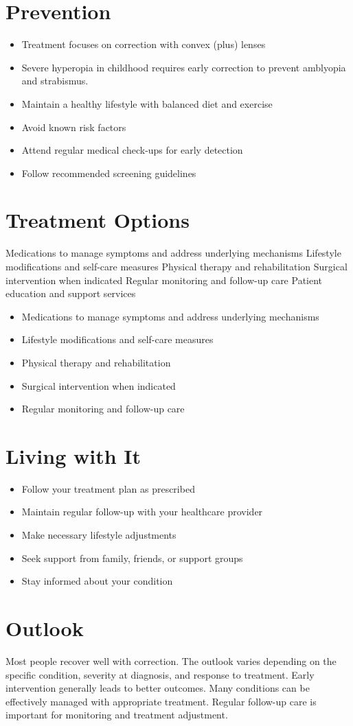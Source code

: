 \section{Prevention}
\begin{itemize}[noitemsep]
  \item Treatment focuses on correction with convex (plus) lenses
  \item Severe hyperopia in childhood requires early correction to prevent amblyopia and strabismus.
  \item Maintain a healthy lifestyle with balanced diet and exercise
  \item Avoid known risk factors
  \item Attend regular medical check-ups for early detection
  \item Follow recommended screening guidelines
\end{itemize}
\section{Treatment Options}
Medications to manage symptoms and address underlying mechanisms Lifestyle modifications and self-care measures Physical therapy and rehabilitation Surgical intervention when indicated Regular monitoring and follow-up care Patient education and support services

\begin{itemize}[noitemsep]
  \item Medications to manage symptoms and address underlying mechanisms
  \item Lifestyle modifications and self-care measures
  \item Physical therapy and rehabilitation
  \item Surgical intervention when indicated
  \item Regular monitoring and follow-up care
\end{itemize}
\section{Living with It}
\begin{itemize}[noitemsep]
  \item Follow your treatment plan as prescribed
  \item Maintain regular follow-up with your healthcare provider
  \item Make necessary lifestyle adjustments
  \item Seek support from family, friends, or support groups
  \item Stay informed about your condition
\end{itemize}
\section{Outlook}
Most people recover well with correction. The outlook varies depending on the specific condition, severity at diagnosis, and response to treatment. Early intervention generally leads to better outcomes. Many conditions can be effectively managed with appropriate treatment. Regular follow-up care is important for monitoring and treatment adjustment.
